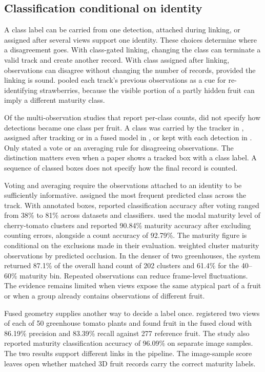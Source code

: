 \subsection{Classification conditional on identity}

A class label can be carried from one detection, attached during linking, or assigned after several views support one identity. These choices determine where a disagreement goes. With class-gated linking, changing the class can terminate a valid track and create another record. With class assigned after linking, observations can disagree without changing the number of records, provided the linking is sound. \citet{kirk2021robust} pooled each track's previous observations as a cue for re-identifying strawberries, because the visible portion of a partly hidden fruit can imply a different maturity class.

Of the \nPerClass multi-observation studies that report per-class counts, \nClassUnstated did not specify how detections became one class per fruit. A class was carried by the tracker in \nClassDuring, assigned after tracking or in a fused model in \nClassAfter, or kept with each detection in \nClassPerDet. Only \nClassVote stated a vote or an averaging rule for disagreeing observations. The distinction matters even when a paper shows a tracked box with a class label. A sequence of classed boxes does not specify how the final record is counted.

Voting and averaging require the observations attached to an identity to be sufficiently informative. \citet{lin2026tomato} assigned the most frequent predicted class across the track. With annotated boxes, reported classification accuracy after voting ranged from 38\% to 81\% across datasets and classifiers. \citet{qi2024improved} used the modal maturity level of cherry-tomato clusters and reported 90.84\% maturity accuracy after excluding counting errors, alongside a count accuracy of 92.79\%. The maturity figure is conditional on the exclusions made in their evaluation. \citet{rong2025end} weighted cluster maturity observations by predicted occlusion. In the denser of two greenhouses, the system returned 87.1\% of the overall hand count of 202 clusters and 61.4\% for the 40--60\% maturity bin. Repeated observations can reduce frame-level fluctuations. The evidence remains limited when views expose the same atypical part of a fruit or when a group already contains observations of different fruit.

Fused geometry supplies another way to decide a label once. \citet{zhang2022measurement} registered two views of each of 50 greenhouse tomato plants and found fruit in the fused cloud with 86.19\% precision and 83.39\% recall against 277 reference fruit. The study also reported maturity classification accuracy of 96.09\% on separate image samples. The two results support different links in the pipeline. The image-sample score leaves open whether matched 3D fruit records carry the correct maturity labels.

